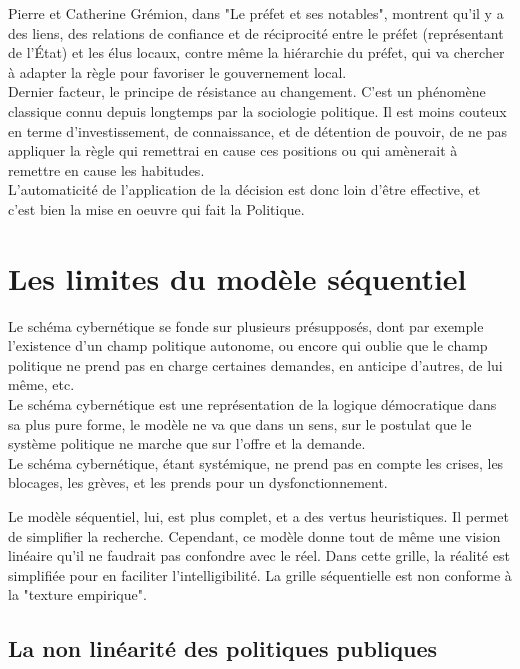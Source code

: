 \documentclass[10pt, a4paper, openany]{book}
\begin{document}
Pierre et Catherine Grémion, dans "Le préfet et ses notables", montrent qu'il y a des liens, des relations de confiance et de réciprocité entre le préfet (représentant de l'État) et les élus locaux, contre même la hiérarchie du préfet, qui va chercher à adapter la règle pour favoriser le gouvernement local. \\
Dernier facteur, le principe de résistance au changement. C'est un phénomène classique connu depuis longtemps par la sociologie politique. Il est moins couteux en terme d'investissement, de connaissance, et de détention de pouvoir, de ne pas appliquer la règle qui remettrai en cause ces positions ou qui amènerait à remettre en cause les habitudes. \\
L'automaticité de l'application de la décision est donc loin d'être effective, et c'est bien la mise en oeuvre qui fait la Politique. 

\section{Les limites du modèle séquentiel}

Le schéma cybernétique se fonde sur plusieurs présupposés, dont par exemple l'existence d'un champ politique autonome, ou encore qui oublie que le champ politique ne prend pas en charge certaines demandes, en anticipe d'autres, de lui même, etc. \\
Le schéma cybernétique est une représentation de la logique démocratique dans sa plus pure forme, le modèle ne va que dans un sens, sur le postulat que le système politique ne marche que sur l'offre et la demande. \\
Le schéma cybernétique, étant systémique, ne prend pas en compte les crises, les blocages, les grèves, et les prends pour un dysfonctionnement.


Le modèle séquentiel, lui, est plus complet, et a des vertus heuristiques. Il permet de simplifier la recherche. Cependant, ce modèle donne tout de même une vision linéaire qu'il ne faudrait pas confondre avec le réel. Dans cette grille, la réalité est simplifiée pour en faciliter l'intelligibilité. La grille séquentielle est non conforme à la "texture empirique". 

\subsection{La non linéarité des politiques publiques}
\end{document}
